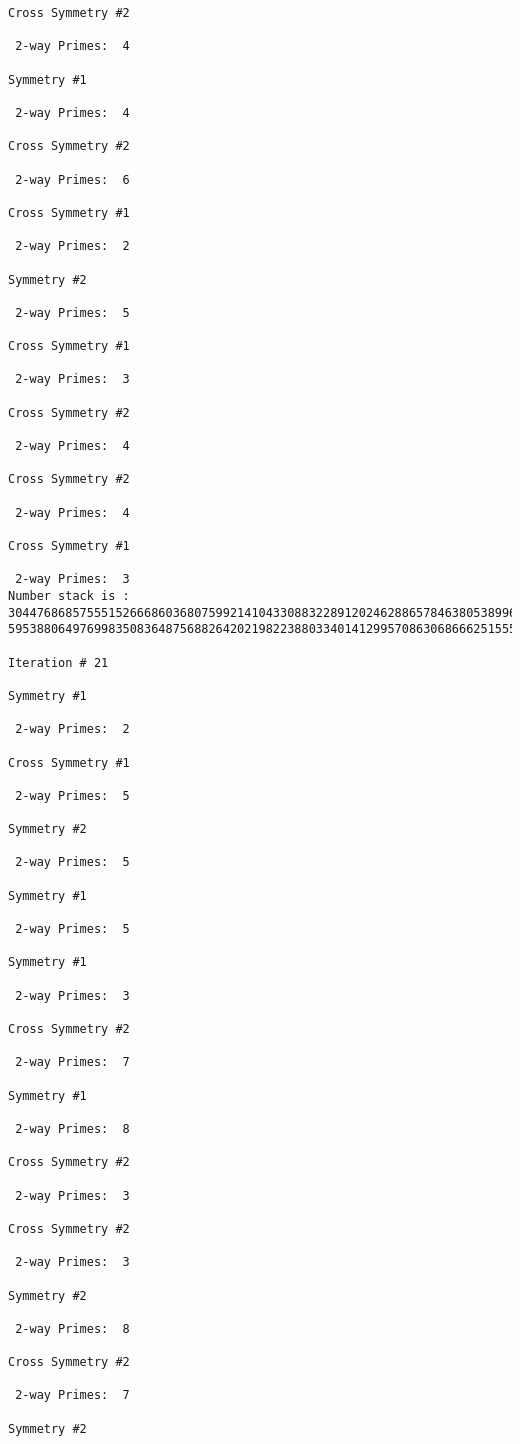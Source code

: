 {{{{\begin{verbatim}
Cross Symmetry #2

 2-way Primes: 	4

Symmetry #1

 2-way Primes: 	4

Cross Symmetry #2

 2-way Primes: 	6

Cross Symmetry #1

 2-way Primes: 	2

Symmetry #2

 2-way Primes: 	5

Cross Symmetry #1

 2-way Primes: 	3

Cross Symmetry #2

 2-way Primes: 	4

Cross Symmetry #2

 2-way Primes: 	4

Cross Symmetry #1

 2-way Primes: 	3
Number stack is :
30447686857555152666860368075992141043308832289120246288657846380538996794608835958544046240163340857
59538806497699835083648756882642021982238803340141299570863068666251555758686744037580433610426404458

Iteration #	21

Symmetry #1

 2-way Primes: 	2

Cross Symmetry #1

 2-way Primes: 	5

Symmetry #2

 2-way Primes: 	5

Symmetry #1

 2-way Primes: 	5

Symmetry #1

 2-way Primes: 	3

Cross Symmetry #2

 2-way Primes: 	7

Symmetry #1

 2-way Primes: 	8

Cross Symmetry #2

 2-way Primes: 	3

Cross Symmetry #2

 2-way Primes: 	3

Symmetry #2

 2-way Primes: 	8

Cross Symmetry #2

 2-way Primes: 	7

Symmetry #2


\end{verbatim}}}}}
